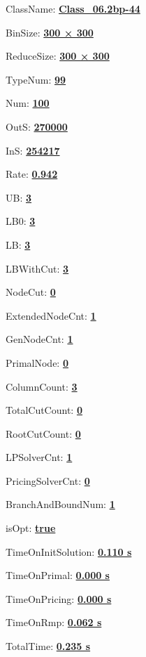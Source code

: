 \documentclass[11pt]{article}
\begin{document}
\pagestyle{empty}


ClassName: \underline{\textbf{Class_06.2bp-44}}
\par
BinSize: \underline{\textbf{300 × 300}}
\par
ReduceSize: \underline{\textbf{300 × 300}}
\par
TypeNum: \underline{\textbf{99}}
\par
Num: \underline{\textbf{100}}
\par
OutS: \underline{\textbf{270000}}
\par
InS: \underline{\textbf{254217}}
\par
Rate: \underline{\textbf{0.942}}
\par
UB: \underline{\textbf{3}}
\par
LB0: \underline{\textbf{3}}
\par
LB: \underline{\textbf{3}}
\par
LBWithCut: \underline{\textbf{3}}
\par
NodeCut: \underline{\textbf{0}}
\par
ExtendedNodeCnt: \underline{\textbf{1}}
\par
GenNodeCnt: \underline{\textbf{1}}
\par
PrimalNode: \underline{\textbf{0}}
\par
ColumnCount: \underline{\textbf{3}}
\par
TotalCutCount: \underline{\textbf{0}}
\par
RootCutCount: \underline{\textbf{0}}
\par
LPSolverCnt: \underline{\textbf{1}}
\par
PricingSolverCnt: \underline{\textbf{0}}
\par
BranchAndBoundNum: \underline{\textbf{1}}
\par
isOpt: \underline{\textbf{true}}
\par
TimeOnInitSolution: \underline{\textbf{0.110 s}}
\par
TimeOnPrimal: \underline{\textbf{0.000 s}}
\par
TimeOnPricing: \underline{\textbf{0.000 s}}
\par
TimeOnRmp: \underline{\textbf{0.062 s}}
\par
TotalTime: \underline{\textbf{0.235 s}}
\par
\newpage
\end{document}
